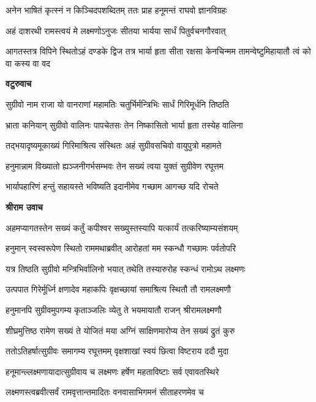 \twolineshloka
{अनेन भाषितं कृत्स्नं न किञ्चिदपशब्दितम्}
{ततः प्राह हनूमन्तं राघवो ज्ञानविग्रहः} %

\twolineshloka
{अहं दाशरथी रामस्त्वयं मे लक्ष्मणोऽनुजः}
{सीतया भार्यया सार्धं पितुर्वचनगौरवात्} %

\threelineshloka
{आगतस्तत्र विपिने स्थितोऽहं दण्डके द्विज}
{तत्र भार्या हृता सीता रक्षसा केनचिन्मम}
{तामन्वेष्टुमिहायातौ त्वं को वा कस्य वा वद} %

\textbf{वटुरुवाच}

\twolineshloka
{सुग्रीवो नाम राजा यो वानराणां महामतिः}
{चतुर्भिर्मन्त्रिभिः सार्धं गिरिमूर्धनि तिष्ठति} %

\twolineshloka
{भ्राता कनियान् सुग्रीवो वालिनः पापचेतसः}
{तेन निष्कासितो भार्या हृता तस्येह वालिना} %

\twolineshloka
{तद्भयादृष्यमूकाख्यं गिरिमाश्रित्य संस्थितः}
{अहं सुग्रीवसचिवो वायुपुत्रो महामते} %

\twolineshloka
{हनुमान्नाम विख्यातो ह्यञ्जनीगर्भसम्भवः}
{तेन सख्यं त्वया युक्तं सुग्रीवेण रघूत्तम} %

\twolineshloka
{भार्यापहारिणं हन्तुं सहायस्ते भविष्यति}
{इदानीमेव गच्छाम आगच्छ यदि रोचते} %

\textbf{श्रीराम उवाच}

\twolineshloka
{अहमप्यागतस्तेन सख्यं कर्तुं कपीश्वर}
{सख्युस्तस्यापि यत्कार्यं तत्करिष्याम्यसंशयम्} %

\twolineshloka
{हनुमान् स्वस्वरूपेण स्थितो राममथाब्रवीत्}
{आरोहतां मम स्कन्धौ गच्छामः पर्वतोपरि} %

\twolineshloka
{यत्र तिष्ठति सुग्रीवो मन्त्रिभिर्वालिनो भयात्}
{तथेति तस्यारुरोह स्कन्धं रामोऽथ लक्ष्मणः} %

\twolineshloka
{उत्पपात गिरेर्मूर्ध्नि क्षणादेव महाकपिः}
{वृक्षच्छायां समाश्रित्य स्थितौ तौ रामलक्ष्मणौ} %

\twolineshloka
{हनुमानपि सुग्रीवमुपगम्य कृताञ्जलिः}
{व्येतु ते भयमायातौ राजन् श्रीरामलक्ष्मणौ} %

\twolineshloka
{शीघ्रमुत्तिष्ठ रामेण सख्यं ते योजितं मया}
{अग्निं साक्षिणमारोप्य तेन सख्यं द्रुतं कुरु} %

\twolineshloka
{ततोऽतिहर्षात्सुग्रीवः समागम्य रघूत्तमम्}
{वृक्षशाखां स्वयं छित्वा विष्टराय ददौ मुदा} %

\twolineshloka
{हनूमान्ल्लक्ष्मणायादात्सुग्रीवाय च लक्ष्मणः}
{हर्षेण महताविष्टाः सर्व एवावतस्थिरे} %

\twolineshloka
{लक्ष्मणस्त्वब्रवीत्सर्वं रामवृत्तान्तमादितः}
{वनवासाभिगमनं सीताहरणमेव च} %


